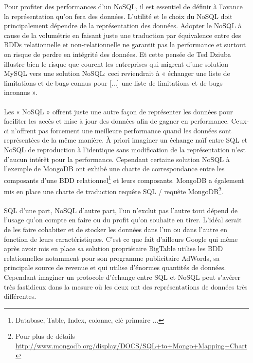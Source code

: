 Pour profiter des performances d'un \textsf{NoSQL}, il est essentiel
de définir à l'avance la représentation qu'on fera des
données. L'utilité et le choix du \textsf{NoSQL} doit principalement
dépendre de la représentation des données. Adopter le \textsf{NoSQL} à
cause de la volumétrie en faisant juste une traduction par équivalence
entre des \textsf{BDDs} relationnelle et non-relationnelle ne garantit
pas la performance et surtout on risque de perdre en intégrité des
données. Et cette pensée de \textsf{Ted Dziuba} illustre bien le risque que
courent les entreprises qui migrent d'une solution \textsf{MySQL} vers  une 
solution \textsf{NoSQL}: ceci reviendrait à « {\sf échanger une liste de limitations 
et de bugs connus pour [...] une liste de limitations et de bugs inconnus} »\cite{DieNosql}.
\\ \\ Les « \textsf{NoSQL} » offrent juste une autre façon
de représenter les données pour faciliter les accès et mise à jour des
données afin de gagner en performance. Ceux-ci n'offrent pas forcement
une meilleure performance quand les données sont représentées de la
même manière. À priori imaginer un échange naïf entre \textsf{SQL} et
\textsf{NoSQL} de reproduction à l'identique sans modification de la
représentation n'est d'aucun intérêt pour la performance. Cependant
certaine solution \textsf{NoSQL} à l'exemple de \textsf{MongoDB} ont
exhibé une charte de correspondance entre les composants d'une
\textsf{BDD} relationnel\footnote{Database, Table, Index, colonne, clé
  primaire ...} et leurs composants. \textsf{MongoDB} a également mis
en place une charte de traduction requête \textsf{SQL} / requête
\textsf{MongoDB}\footnote{Pour plus de détails
  \url{http://www.mongodb.org/display/DOCS/SQL+to+Mongo+Mapping+Chart}}.
\\
\\
\textsf{SQL} d'une part, \textsf{NoSQL} d'autre part, l'un n'exclut pas l'autre
tout dépend de l'usage qu'on compte en faire ou du profit qu'on souhaite en tirer. L'idéal serait de les faire cohabiter et de stocker les données dans l'un ou dans l'autre en fonction de leurs caractéristiques. C'est ce que fait d'ailleurs \textsf{Google} qui même après avoir mis en place sa solution propriétaire \textsf{BigTable} utilise les \textsf{BDD} relationnelles notamment pour son  programme publicitaire \textsf{AdWords}, sa principale source de revenue et qui utilise d'énormes quantités de données. Cependant imaginer un protocole d'échange entre \textsf{SQL} et \textsf{NoSQL} peut s'avérer très fastidieux dans la mesure où les deux ont des représentations de données très différentes.  
